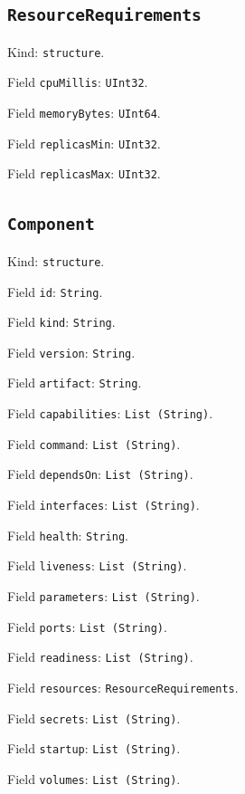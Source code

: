 \documentclass[11pt]{article}
\begin{document}
\subsection*{\texttt{ResourceRequirements}}
\noindent Kind: \texttt{structure}.\par
\noindent Field \texttt{cpuMillis}: \texttt{UInt32}.\par
\noindent Field \texttt{memoryBytes}: \texttt{UInt64}.\par
\noindent Field \texttt{replicasMin}: \texttt{UInt32}.\par
\noindent Field \texttt{replicasMax}: \texttt{UInt32}.\par
\subsection*{\texttt{Component}}
\noindent Kind: \texttt{structure}.\par
\noindent Field \texttt{id}: \texttt{String}.\par
\noindent Field \texttt{kind}: \texttt{String}.\par
\noindent Field \texttt{version}: \texttt{String}.\par
\noindent Field \texttt{artifact}: \texttt{String}.\par
\noindent Field \texttt{capabilities}: \texttt{List (String)}.\par
\noindent Field \texttt{command}: \texttt{List (String)}.\par
\noindent Field \texttt{dependsOn}: \texttt{List (String)}.\par
\noindent Field \texttt{interfaces}: \texttt{List (String)}.\par
\noindent Field \texttt{health}: \texttt{String}.\par
\noindent Field \texttt{liveness}: \texttt{List (String)}.\par
\noindent Field \texttt{parameters}: \texttt{List (String)}.\par
\noindent Field \texttt{ports}: \texttt{List (String)}.\par
\noindent Field \texttt{readiness}: \texttt{List (String)}.\par
\noindent Field \texttt{resources}: \texttt{ResourceRequirements}.\par
\noindent Field \texttt{secrets}: \texttt{List (String)}.\par
\noindent Field \texttt{startup}: \texttt{List (String)}.\par
\noindent Field \texttt{volumes}: \texttt{List (String)}.\par
\end{document}
